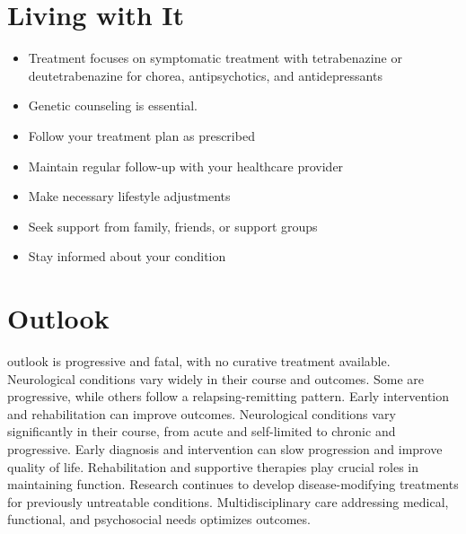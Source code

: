 \section{Living with It}
\begin{itemize}[noitemsep]
  \item Treatment focuses on symptomatic treatment with tetrabenazine or deutetrabenazine for chorea, antipsychotics, and antidepressants
  \item Genetic counseling is essential.
  \item Follow your treatment plan as prescribed
  \item Maintain regular follow-up with your healthcare provider
  \item Make necessary lifestyle adjustments
  \item Seek support from family, friends, or support groups
  \item Stay informed about your condition
\end{itemize}
\section{Outlook}
outlook is progressive and fatal, with no curative treatment available. Neurological conditions vary widely in their course and outcomes. Some are progressive, while others follow a relapsing-remitting pattern. Early intervention and rehabilitation can improve outcomes. Neurological conditions vary significantly in their course, from acute and self-limited to chronic and progressive. Early diagnosis and intervention can slow progression and improve quality of life. Rehabilitation and supportive therapies play crucial roles in maintaining function. Research continues to develop disease-modifying treatments for previously untreatable conditions. Multidisciplinary care addressing medical, functional, and psychosocial needs optimizes outcomes.
